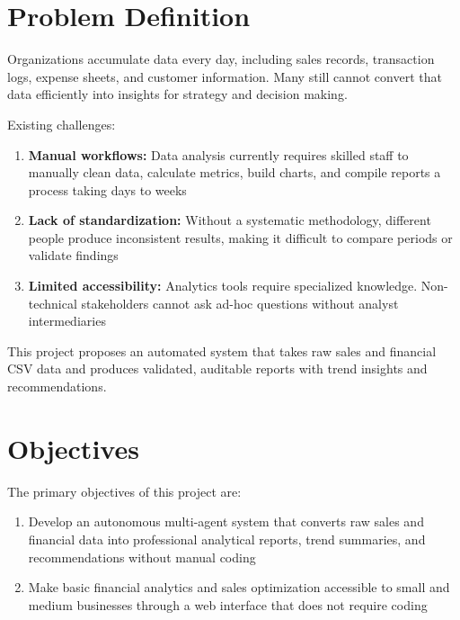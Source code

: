 \documentclass[12pt,a4paper,openany]{report}
\begin{document}
\section{Problem Definition}

Organizations accumulate data every day, including sales records, transaction logs, expense sheets, and customer information. Many still cannot convert that data efficiently into insights for strategy and decision making.

Existing challenges:

\begin{enumerate}
	\item \textbf{Manual workflows:} Data analysis currently requires skilled staff to manually clean data, calculate metrics, build charts, and compile reports a process taking days to weeks

	\item \textbf{Lack of standardization:} Without a systematic methodology, different people produce inconsistent results, making it difficult to compare periods or validate findings

	\item \textbf{Limited accessibility:} Analytics tools require specialized knowledge. Non-technical stakeholders cannot ask ad-hoc questions without analyst intermediaries

\end{enumerate}

This project proposes an automated system that takes raw sales and financial CSV data and produces validated, auditable reports with trend insights and recommendations.

\section{Objectives}

The primary objectives of this project are:

\begin{enumerate}
	\item Develop an autonomous multi-agent system that converts raw sales and financial data into professional analytical reports, trend summaries, and recommendations without manual coding

	\item Make basic financial analytics and sales optimization accessible to small and medium businesses through a web interface that does not require coding
\end{enumerate}
\end{document}
